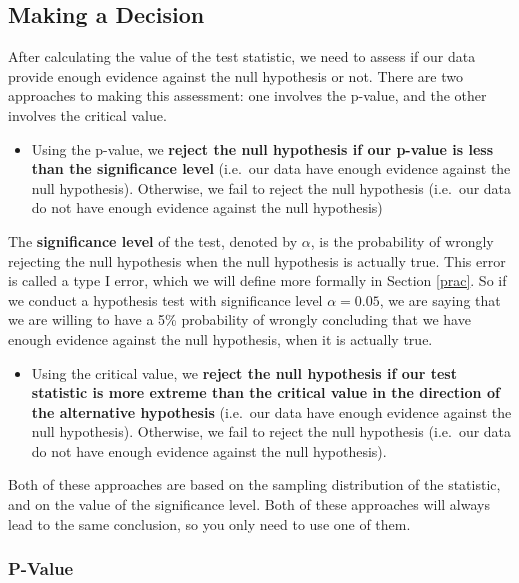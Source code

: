 \documentclass[
]{book}
\providecommand{\tightlist}{%
  \setlength{\itemsep}{0pt}\setlength{\parskip}{0pt}}
\theoremstyle{definition}
\theoremstyle{definition}
\theoremstyle{definition}
\theoremstyle{definition}
\theoremstyle{remark}
\begin{document}
\hypertarget{decision}{%
\subsection{Making a Decision}\label{decision}}

After calculating the value of the test statistic, we need to assess if our data provide enough evidence against the null hypothesis or not. There are two approaches to making this assessment: one involves the p-value, and the other involves the critical value.

\begin{itemize}
\tightlist
\item
  Using the p-value, we \textbf{reject the null hypothesis if our p-value is less than the significance level} (i.e.~our data have enough evidence against the null hypothesis). Otherwise, we fail to reject the null hypothesis (i.e.~our data do not have enough evidence against the null hypothesis)
\end{itemize}

The \textbf{significance level} of the test, denoted by \(\alpha\), is the probability of wrongly rejecting the null hypothesis when the null hypothesis is actually true. This error is called a type I error, which we will define more formally in Section \ref{prac}. So if we conduct a hypothesis test with significance level \(\alpha = 0.05\), we are saying that we are willing to have a 5\% probability of wrongly concluding that we have enough evidence against the null hypothesis, when it is actually true.

\begin{itemize}
\tightlist
\item
  Using the critical value, we \textbf{reject the null hypothesis if our test statistic is more extreme than the critical value in the direction of the alternative hypothesis} (i.e.~our data have enough evidence against the null hypothesis). Otherwise, we fail to reject the null hypothesis (i.e.~our data do not have enough evidence against the null hypothesis).
\end{itemize}

Both of these approaches are based on the sampling distribution of the statistic, and on the value of the significance level. Both of these approaches will always lead to the same conclusion, so you only need to use one of them.

\hypertarget{pval}{%
\subsubsection{P-Value}\label{pval}}
\end{document}
